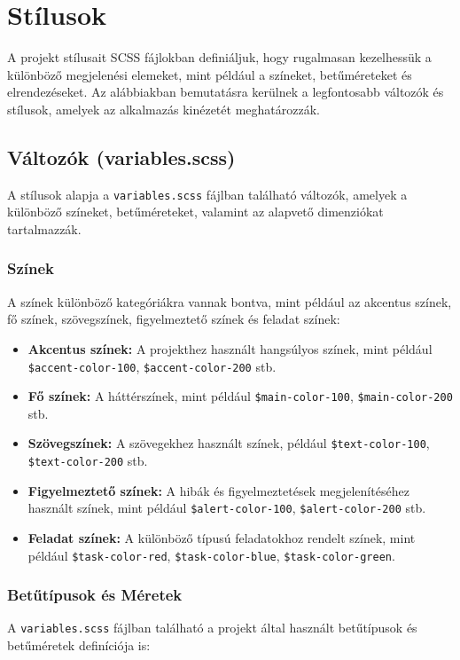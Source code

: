\documentclass[12pt]{report}
\begin{document}
\section{Stílusok}

A projekt stílusait SCSS fájlokban definiáljuk, hogy rugalmasan kezelhessük a különböző megjelenési elemeket, mint például a színeket, betűméreteket és elrendezéseket. Az alábbiakban bemutatásra kerülnek a legfontosabb változók és stílusok, amelyek az alkalmazás kinézetét meghatározzák.

\subsection{Változók (variables.scss)}

A stílusok alapja a \texttt{variables.scss} fájlban található változók, amelyek a különböző színeket, betűméreteket, valamint az alapvető dimenziókat tartalmazzák.

\subsubsection{Színek}
A színek különböző kategóriákra vannak bontva, mint például az akcentus színek, fő színek, szövegszínek, figyelmeztető színek és feladat színek:

\begin{itemize}
    \item \textbf{Akcentus színek:} A projekthez használt hangsúlyos színek, mint például \texttt{\$accent-color-100}, \texttt{\$accent-color-200} stb.
    \item \textbf{Fő színek:} A háttérszínek, mint például \texttt{\$main-color-100}, \texttt{\$main-color-200} stb.
    \item \textbf{Szövegszínek:} A szövegekhez használt színek, például \texttt{\$text-color-100}, \texttt{\$text-color-200} stb.
    \item \textbf{Figyelmeztető színek:} A hibák és figyelmeztetések megjelenítéséhez használt színek, mint például \texttt{\$alert-color-100}, \texttt{\$alert-color-200} stb.
    \item \textbf{Feladat színek:} A különböző típusú feladatokhoz rendelt színek, mint például \texttt{\$task-color-red}, \texttt{\$task-color-blue}, \texttt{\$task-color-green}.
\end{itemize}

\subsubsection{Betűtípusok és Méretek}
A \texttt{variables.scss} fájlban található a projekt által használt betűtípusok és betűméretek definíciója is:
\end{document}
